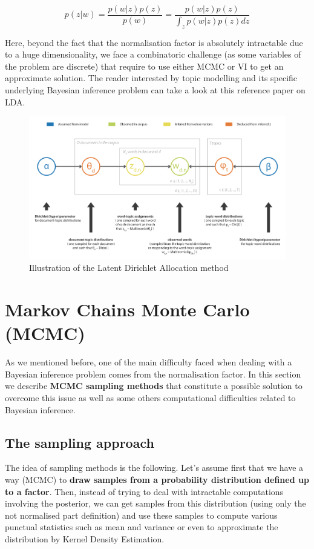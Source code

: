 \begin{equation}p(z | w)=\frac{p(w | z) p(z)}{p(w)}=\frac{p(w | z) p(z)}{\int_{z} p(w | z) p(z) d z}\end{equation}

Here, beyond the fact that the normalisation factor is absolutely intractable due to a huge dimensionality, we face a combinatoric challenge (as some variables of the problem are discrete) that require to use either MCMC or VI to get an approximate solution. The reader interested by topic modelling and its specific underlying Bayesian inference problem can take a look at this reference paper \cite{Blei2003a}  on LDA.


\begin{figure}[h]
    \centering
\includegraphics[width=\textwidth]{pic/p05c07-snip02.png}
    \caption{Illustration of the Latent Dirichlet Allocation method}
    \label{fig:p05c07-snip02}
\end{figure}


\section{Markov Chains Monte Carlo (MCMC)}

As we mentioned before, one of the main difficulty faced when dealing with a Bayesian inference problem comes from the normalisation factor. In this section we describe \textbf{MCMC sampling methods} that constitute a possible solution to overcome this issue as well as some others computational difficulties related to Bayesian inference.

\subsection{The sampling approach}

The idea of sampling methods is the following. Let's assume first that we have a way (MCMC) to \textbf{draw samples from a probability distribution defined up to a factor}. Then, instead of trying to deal with intractable computations involving the posterior, we can get samples from this distribution (using only the not normalised part definition) and use these samples to compute various punctual statistics such as mean and variance or even to approximate the distribution by Kernel Density Estimation.

